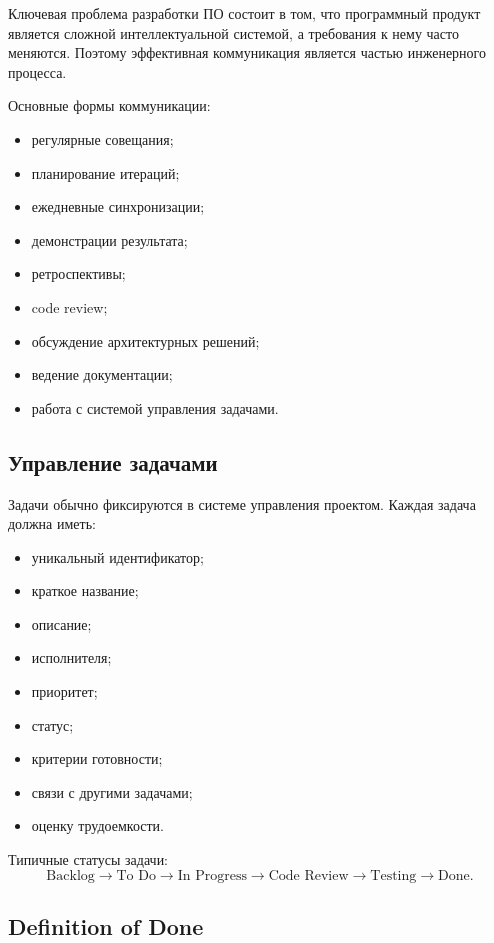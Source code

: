 \documentclass[12pt,a4paper]{article}
\begin{document}
Ключевая проблема разработки ПО состоит в том, что программный продукт является сложной интеллектуальной системой, а требования к нему часто меняются. Поэтому эффективная коммуникация является частью инженерного процесса.

Основные формы коммуникации:
\begin{itemize}
    \item регулярные совещания;
    \item планирование итераций;
    \item ежедневные синхронизации;
    \item демонстрации результата;
    \item ретроспективы;
    \item code review;
    \item обсуждение архитектурных решений;
    \item ведение документации;
    \item работа с системой управления задачами.
\end{itemize}

\subsection{Управление задачами}

Задачи обычно фиксируются в системе управления проектом. Каждая задача должна иметь:
\begin{itemize}
    \item уникальный идентификатор;
    \item краткое название;
    \item описание;
    \item исполнителя;
    \item приоритет;
    \item статус;
    \item критерии готовности;
    \item связи с другими задачами;
    \item оценку трудоемкости.
\end{itemize}

Типичные статусы задачи:
\[
\text{Backlog} \rightarrow \text{To Do} \rightarrow \text{In Progress} \rightarrow \text{Code Review} \rightarrow \text{Testing} \rightarrow \text{Done}.
\]

\subsection{Definition of Done}
\end{document}
